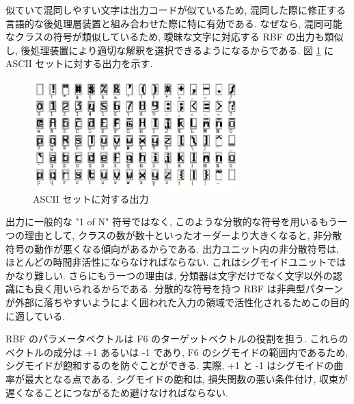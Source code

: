 \documentclass[twocolumn]{jarticle}     %
\begin{document}
似ていて混同しやすい文字は出力コードが似ているため, 混同した際に修正する言語的な後処理層装置と組み合わせた際に特に有効である. なぜなら, 混同可能なクラスの符号が類似しているため, 曖昧な文字に対応する RBF の出力も類似し, 後処理装置により適切な解釈を選択できるようになるからである. 図 \ref{fig:3} に ASCII セットに対する出力を示す.
\begin{figure}[t]
  \centering
  \includegraphics[width=80mm]{assets/3.eps}
  \caption{ASCII セットに対する出力}
  \label{fig:3}
\end{figure}

\par
出力に一般的な "1 of N" 符号ではなく, このような分散的な符号を用いるもう一つの理由として, クラスの数が数十といったオーダーより大きくなると, 非分散符号の動作が悪くなる傾向があるからである.
出力ユニット内の非分散符号は, ほとんどの時間非活性にならなければならない. これはシグモイドユニットではかなり難しい. さらにもう一つの理由は, 分類器は文字だけでなく文字以外の認識にも良く用いられるからである. 分散的な符号を持つ RBF は非典型パターンが外部に落ちやすいようによく囲われた入力の領域で活性化されるためこの目的に適している.
\par
RBF のパラメータベクトルは F6 のターゲットベクトルの役割を担う. これらのベクトルの成分は +1 あるいは -1 であり, F6 のシグモイドの範囲内であるため,シグモイドが飽和するのを防ぐことができる. 実際, +1 と -1 はシグモイドの曲率が最大となる点である.
シグモイドの飽和は, 損失関数の悪い条件付け, 収束が遅くなることにつながるため避けなければならない.
\end{document}
